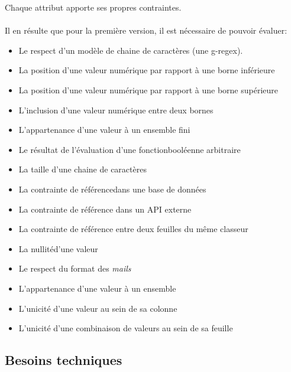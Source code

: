 Chaque attribut apporte ses propres contraintes.

\paragraph{}
Il en résulte que pour la première version, il est nécessaire de pouvoir évaluer:
\begin{itemize}
    \item Le respect d'un modèle de chaine de caractères (une \gls{g-regex}).
    \item La position d'une valeur numérique par rapport à une borne inférieure
    \item La position d'une valeur numérique par rapport à une borne supérieure
    \item L'inclusion d'une valeur numérique entre deux bornes
    \item L'appartenance d'une valeur à un ensemble fini
    \item Le résultat de l'évaluation d'une fonction\fnmark booléenne arbitraire
    \item La taille d'une chaine de caractères
    \item La contrainte de référence\fnmark dans une base de données
    \item La contrainte de référence dans un API externe
    \item La contrainte de référence entre deux feuilles du même classeur
    \item La nullité\fnmark d'une valeur
    \item Le respect du format des \textit{mails}
    \item L'appartenance d'une valeur à un ensemble
    \item L'unicité d'une valeur au sein de sa colonne
    \item L'unicité d'une combinaison de valeurs au sein de sa feuille
\end{itemize}

\subsection{Besoins techniques}
\label{subsec:tech-needs}

